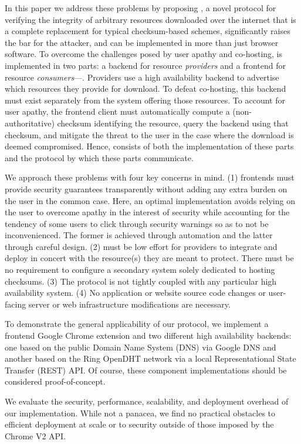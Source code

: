 In this paper we address these problems by proposing \SYSTEM{}, a novel protocol
for verifying the integrity of arbitrary resources downloaded over the internet
that is a complete replacement for typical checksum-based schemes, significantly
raises the bar for the attacker, and can be implemented in more than just
browser software. To overcome the challenges posed by user apathy and
co-hosting, \SYSTEM{} is implemented in two parts: a backend for resource
\emph{providers} and a frontend for resource \emph{consumers}---. Providers use a high availability backend to advertise which resources
they provide for download. To defeat co-hosting, this backend must exist
separately from the system offering those resources. To account for user apathy,
the frontend client must automatically compute a (non-authoritative) checksum
identifying the resource, query the backend using that checksum, and mitigate
the threat to the user in the case where the download is deemed compromised.
Hence, \SYSTEM{} consists of both the implementation of these parts and the
protocol by which these parts communicate.

We approach these problems with four key concerns in mind. (1) \SYSTEM{}
frontends must provide security guarantees transparently without adding any
extra burden on the user in the common case. Here, an optimal implementation
avoids relying on the user to overcome apathy in the interest of security while
accounting for the tendency of some users to click through security warnings so
as to not be inconvenienced. The former is achieved through automation and the
latter through careful design. (2) \SYSTEM{} must be low effort for providers
to integrate and deploy in concert with the resource(s) they are meant to
protect. There must be no requirement to configure a secondary system solely
dedicated to hosting checksums. (3) The protocol is not tightly coupled with any
particular high availability system. (4) No application or website source code
changes or user-facing server or web infrastructure modifications are necessary.

To demonstrate the general applicability of our protocol, we implement a
frontend Google Chrome extension and two different high availability backends:
one based on the public Domain Name System (DNS) via Google DNS and another
based on the Ring OpenDHT network via a local Representational State Transfer
(REST) API. Of course, these \SYSTEM{} component implementations should be
considered proof-of-concept.

We evaluate the security, performance, scalability, and deployment overhead of
our implementation. While not a panacea, we find no practical obstacles to
efficient deployment at scale or to security outside of those imposed by the
Chrome V2 API.

